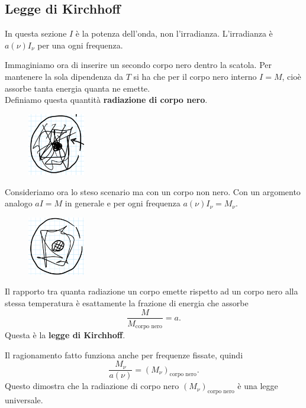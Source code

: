 \subsection{Legge di Kirchhoff}
In questa sezione $I$ \`e la potenza dell'onda, non l'irradianza. L'irradianza \`e $a(\nu)I_\nu$ per una ogni frequenza.

\noindent
Immaginiamo ora di inserire un secondo corpo nero dentro la scatola. 
Per mantenere la sola dipendenza da $T$ si ha che per il corpo nero interno $I=M$, cio\`e assorbe tanta energia quanta ne emette.\\
Definiamo questa quantit\`a \textbf{radiazione di corpo nero}.

\begin{figure}[!htb]
    \centering
    \includegraphics[width=2.5cm]{images/corpo_nero_con_dentro_corpo_nero.png}
\end{figure}

\noindent
Consideriamo ora lo steso scenario ma con un corpo non nero. Con un argomento analogo $aI=M$ in generale e per ogni frequenza $a(\nu)I_\nu=M_\nu$.

\begin{figure}[!htb]
    \centering
    \includegraphics[width=2.5cm]{images/corpo_nero_con_dentro_corpo_grigio.png}
\end{figure}

\begin{remark}
Il rapporto tra quanta radiazione un corpo emette rispetto ad un corpo nero alla stessa temperatura \`e esattamente la frazione di energia che assorbe
\[\frac{M}{M_{\text{corpo nero}}}=a.\]
Questa \`e la \textbf{legge di Kirchhoff}.
\end{remark}

\noindent Il ragionamento fatto funziona anche per frequenze fissate, quindi
\[\frac{M_\nu}{a(\nu)}=(M_\nu)_{\text{corpo nero}}.\]
Questo dimostra che la radiazione di corpo nero $(M_\nu)_{\text{corpo nero}}$ \`e una legge universale.

